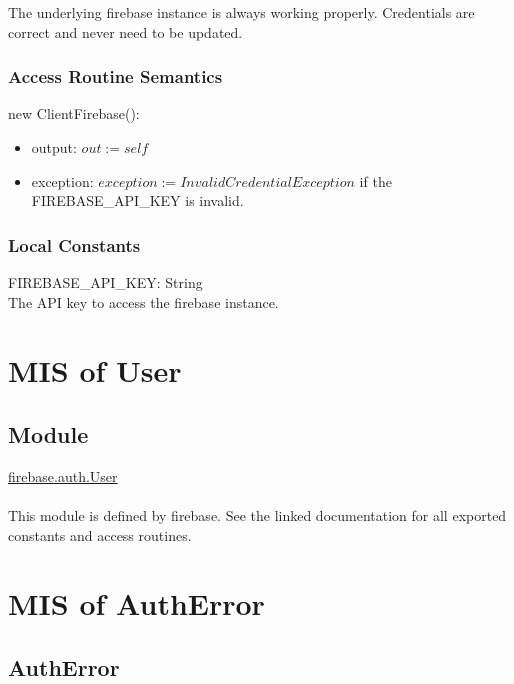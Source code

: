 \documentclass[12pt, titlepage]{article}
\begin{document}
The underlying firebase instance is always working properly. Credentials are correct and never need to be updated.

\subsubsection{Access Routine Semantics}

\noindent new ClientFirebase():
\begin{itemize} 
\item output: $out := self$ 
\item exception: $exception := InvalidCredentialException$ if the FIREBASE\_API\_KEY is invalid.  
\end{itemize} 

\subsubsection{Local Constants}

FIREBASE\_API\_KEY: String \\
The API key to access the firebase instance.
  
\medskip
\newpage
\section{MIS of User} \label{User} 

\subsection{Module}

\href{https://firebase.google.com/docs/reference/js/v8/firebase.User}{firebase.auth.User} \\ \\
This module is defined by firebase. See the linked documentation for all exported constants and access routines.
  
\medskip
\newpage
\section{MIS of AuthError} \label{AuthError} 

\subsection{AuthError}
\end{document}
